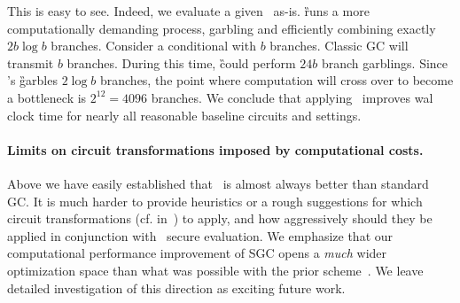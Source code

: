This is easy to see.  Indeed, we evaluate a given \cir\ as-is.  \G runs a more computationally demanding  process, garbling and efficiently combining exactly $2 b \log b$ branches.  Consider a conditional with $b$ branches.  Classic GC will transmit $b$ branches.  During this time, \G could perform $24 b$ branch garblings. Since \ourscheme's \G garbles $2\log b$ branches, the point where computation will cross over to become a bottleneck is $2^{12} = 4096$ branches.  We conclude that applying \ourscheme\ improves wal clock time for nearly all reasonable baseline circuits and settings.


\paragraph{Limits on circuit transformations imposed by computational costs.}
Above we have easily  established that \ourscheme\ is almost always better than standard GC.   It is much harder to provide heuristics or a rough suggestions for which circuit transformations (cf. in~) to apply, and how aggressively should they be applied in conjunction with \ourscheme\ secure evaluation.  We emphasize that our computational performance improvement of SGC opens a {\em much} wider optimization space than what was possible with the prior scheme~\HK.  We leave detailed investigation of this direction as exciting future work.






